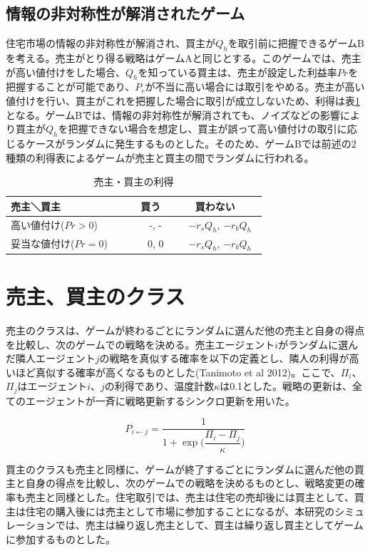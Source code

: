 \documentclass[a4paper,fontsize=11pt,report,notitlepage,line_length=38zw,number_of_lines=40,dvipdfmx]{jlreq}
\begin{document}
\subsection{情報の非対称性が解消されたゲーム}
住宅市場の情報の非対称性が解消され、買主が$Q_h$を取引前に把握できるゲームBを考える。売主がとり得る戦略はゲームAと同じとする。このゲームでは、売主が高い値付けをした場合、$Q_h$を知っている買主は、売主が設定した利益率$Pr$を把握することが可能であり、$P_r$が不当に高い場合には取引をやめる。売主が高い値付けを行い、買主がこれを把握した場合に取引が成立しないため、利得は表\ref{ritokuB}となる。ゲームBでは、情報の非対称性が解消されても、ノイズなどの影響により買主が$Q_h$を把握できない場合を想定し、買主が誤って高い値付けの取引に応じるケースがランダムに発生するものとした。そのため、ゲームBでは前述の2種類の利得表によるゲームが売主と買主の間でランダムに行われる。

\begin{table}
\begin{center}
\caption{売主・買主の利得}
\label{ritokuB}
\begin{tabular}{l|cc}
売主＼買主 & 買う & 買わない \\ \hline
高い値付け($Pr>0$)　　 & 　-, - & 　$-r_sQ_h$,  $-r_bQ_h$　 \\
妥当な値付け($Pr=0$)　　 & 　0, 0 & 　$-r_sQ_h$,  $-r_bQ_h$　
\end{tabular}
\end{center}
\end{table}%

\section{売主、買主のクラス}
売主のクラスは、ゲームが終わるごとにランダムに選んだ他の売主と自身の得点を比較し、次のゲームでの戦略を決める。売主エージェント$i$がランダムに選んだ隣人エージェント$j$の戦略を真似する確率を以下の定義とし、隣人の利得が高いほど真似する確率が高くなるものとした(Tanimoto et al 2012)\cite{tanimoto2012}。ここで、$\Pi_i$、$\Pi_j$はエージェント$i$、$j$の利得であり、温度計数$\kappa$は0.1とした。戦略の更新は、全てのエージェントが一斉に戦略更新するシンクロ更新を用いた。

\begin{equation}
P_{i \gets j}=\dfrac{1}{1+\exp\biggl(\dfrac{\Pi_i-\Pi_j}{\kappa}\biggr)}
\end{equation}

買主のクラスも売主と同様に、ゲームが終了するごとにランダムに選んだ他の買主と自身の得点を比較し、次のゲームでの戦略を決めるものとし、戦略変更の確率も売主と同様とした。住宅取引では、売主は住宅の売却後には買主として、買主は住宅の購入後には売主として市場に参加することになるが、本研究のシミュレーションでは、売主は繰り返し売主として、買主は繰り返し買主としてゲームに参加するものとした。
\end{document}
